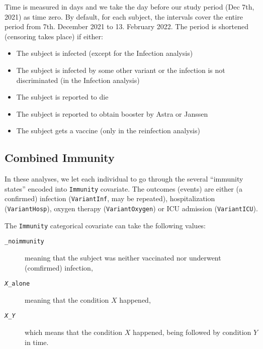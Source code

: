 \documentclass[9pt,onecolumn,twoside,lineno]{pnas-new}
\begin{document}
Time is measured in days and we take the day before our study period (Dec 7th, 2021) as time zero. By default, for each subject, the intervals cover the entire period from 7th. December 2021 to 13. February 2022. The period is shortened (censoring takes place) if either:
\begin{itemize} 
\item The subject is infected (except for the Infection analysis)
\item The subject is infected by some other variant or the infection is not discriminated (in the Infection analysis)
\item The subject is reported to die
\item The subject is reported to obtain booster by Astra or Janssen
\item The subject gets a vaccine (only in the reinfection analysis)
\end{itemize}


\subsection*{Combined Immunity}
In these analyses,
we let each individual to go through the several ``immunity states'' encoded into {\tt Immunity} covariate. The outcomes (events) are either (a confirmed) infection ({\tt VariantInf}, may be repeated), hospitalization ({\tt VariantHosp}), oxygen therapy ({\tt VariantOxygen}) or ICU admission ({\tt VariantICU}).

The {\tt Immunity} categorical covariate can take the following values:
\begin{description}
\item[{\tt \_noimmunity}] meaning that the subject was neither vaccinated nor underwent (comfirmed) infection,
\item[{\tt {\em X}\_alone}] meaning that the condition $X$ happened,
\item[{\tt {\em X}\_{\em Y}}] which means that the condition $X$ happened, being followed by condition $Y$ in time. 
\end{description}
\end{document}
